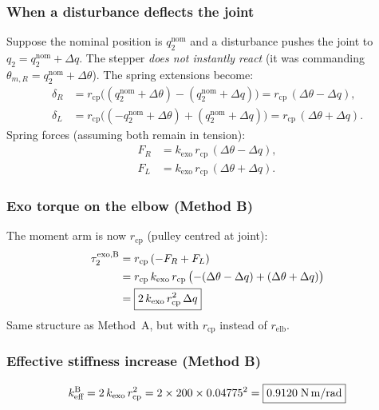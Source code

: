 \documentclass[11pt, a4paper]{article}
\begin{document}
\subsubsection{When a disturbance deflects the joint}

Suppose the nominal position is $q_2^{\text{nom}}$ and a disturbance pushes
the joint to $q_2 = q_2^{\text{nom}} + \Delta q$.  The stepper \emph{does
not instantly react} (it was commanding $\theta_{m,R} = q_2^{\text{nom}} +
\Delta\theta$).  The spring extensions become:
%
\begin{align}
    \delta_R &= r_{\text{cp}}\bigl(
        (q_2^{\text{nom}} + \Delta\theta) - (q_2^{\text{nom}} + \Delta q)
    \bigr)
    = r_{\text{cp}}\,(\Delta\theta - \Delta q), \\
    \delta_L &= r_{\text{cp}}\bigl(
        (-q_2^{\text{nom}} + \Delta\theta) + (q_2^{\text{nom}} + \Delta q)
    \bigr)
    = r_{\text{cp}}\,(\Delta\theta + \Delta q).
\end{align}
%
Spring forces (assuming both remain in tension):
%
\begin{align}
    F_R &= k_{\text{exo}}\,r_{\text{cp}}\,(\Delta\theta - \Delta q), \\
    F_L &= k_{\text{exo}}\,r_{\text{cp}}\,(\Delta\theta + \Delta q).
\end{align}

\subsubsection{Exo torque on the elbow (Method B)}

The moment arm is now $r_{\text{cp}}$ (pulley centred at joint):
%
\begin{align}
    \tau_2^{\text{exo,B}}
    &= r_{\text{cp}}\,(-F_R + F_L) \notag \\
    &= r_{\text{cp}}\,k_{\text{exo}}\,r_{\text{cp}}\,\bigl(
        -(\Delta\theta - \Delta q) + (\Delta\theta + \Delta q)
    \bigr) \notag \\
    &= \boxed{2\,k_{\text{exo}}\,r_{\text{cp}}^2\,\Delta q}
    \label{eq:tau_B}
\end{align}
%
Same structure as Method~A, but with $r_{\text{cp}}$ instead of
$r_{\text{elb}}$.

\subsubsection{Effective stiffness increase (Method B)}
%
\begin{equation}\label{eq:keff_B}
    k_{\text{eff}}^{\text{B}} = 2\,k_{\text{exo}}\,r_{\text{cp}}^2
    = 2 \times 200 \times 0.04775^2
    = \boxed{0.9120\;\text{N\,m/rad}}
\end{equation}
\end{document}
